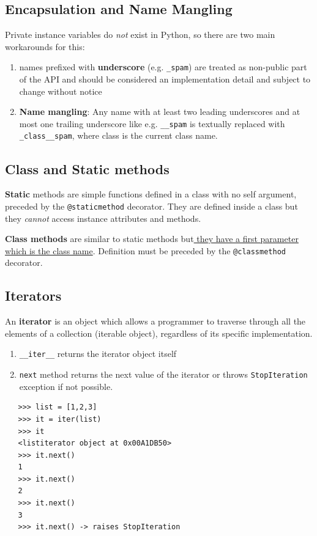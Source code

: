 \subsection{Encapsulation and Name Mangling}
Private instance variables do \textit{not} exist in Python,
so there are two main workarounds for this:
\begin{enumerate}
   \item names prefixed with \textbf{underscore} (e.g. \lstinline|_spam|) are treated as
   non-public part of the API and should be considered an implementation detail and subject to change without notice
   \item \textbf{Name mangling}:
   Any name with at least two leading underscores and at most one trailing
   underscore like e.g. \lstinline|__spam| is textually replaced with \lstinline|_class__spam|,
   where class is the current class name.
\end{enumerate}

\subsection{Class and Static methods}
\textbf{Static} methods are simple functions defined in a class with no self
argument, preceded by the \lstinline|@staticmethod| decorator.
They are defined inside a class but they \textit{cannot} access instance attributes and methods.

\textbf{Class methods} are similar to static methods but\ul{ they have a first parameter which is the class name}.
Definition must be preceded by the \lstinline|@classmethod| decorator.

\subsection{Iterators}
\begin{paracol}{2}
   An \textbf{iterator} is an object which allows a programmer to traverse through all the
   elements of a collection (iterable object), regardless of its specific implementation.
   \begin{enumerate}
      \item \lstinline|__iter__| returns the iterator object itself
      \item \lstinline|next| method returns the next value of the iterator or throws \lstinline|StopIteration| exception if not possible.
   \end{enumerate}
   
   \switchcolumn

   \begin{lstlisting}
   >>> list = [1,2,3]
   >>> it = iter(list)
   >>> it
   <listiterator object at 0x00A1DB50>
   >>> it.next()
   1
   >>> it.next()
   2
   >>> it.next()
   3
   >>> it.next() -> raises StopIteration
   \end{lstlisting}
\end{paracol}


